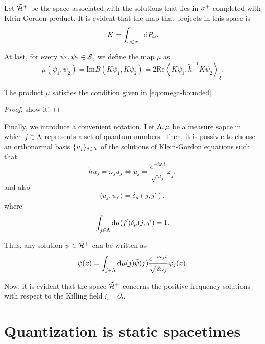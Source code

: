 Let \(\tilde{{\mathcal{H}}}^+\) be the space associated with the solutions that lies in \(\sigma^+\) completed with Klein-Gordon product. It is evident that the map that projects in this space is
\begin{equation}
    K=\int_{\omega\in\sigma^+}\mathrm{d} P_{\omega}.
\end{equation}

At last, for every \(\psi_1,\psi_2\in{\mathcal{S}}\), we define the map \(\mu\) as
\begin{equation}
    \mu(\psi_1,\psi_2)=\text{Im}B(K\psi_1,K\psi_2)=2\text{Re}\left\langle K\psi_1,\tilde{h}^{-1}K\psi_2\right\rangle_\xi.
\end{equation}
\begin{proposition}
    The product \(\mu\) satisfies the condition given in \cref{eq:omega-bounded}.
\end{proposition}
\begin{proof}
    show it!
\end{proof}

Finally, we introduce a convenient notation. Let \(\Lambda,\mu\) be a measure sapce in which \(j\in\Lambda\) represents a set of quantum numbers. Then, it is possivle to choose an orthonormal basis \(\{u_j\}_{j\in\Lambda}\) of the solutions of Klein-Gordon equations such that
\begin{equation}
    \tilde{h}u_j=\omega_j u_j\iff u_j=\frac{e^{-i\omega_jt}}{\sqrt{\omega_j}}\varphi_j,
\end{equation}
and also
\begin{equation}
    \langle u_j,u_{j'}\rangle=\delta_{\mu}(j,j'),
\end{equation}
where
\begin{equation}
    \int_{j\in\Lambda}\mathrm{d}\mu(j')\delta_\mu(j,j')=1.
\end{equation}

Thus, any solution \(\psi\in\tilde{{\mathcal{H}}}^+\) can be written as 
\begin{equation}
    \psi(x)=\int_{j\in\Lambda}\mathrm{d}\mu(j)\tilde{\psi}(j)\frac{e^{-i\omega_jt}}{\sqrt{2\omega_j}}\varphi_j(x).
\end{equation}

Now, it is evident that the space \(\tilde{{\mathcal{H}}}^+\) concerns the positive frequency solutions with respect to the Killing field \(\xi=\partial_t\). 

\section{Quantization is static spacetimes}

